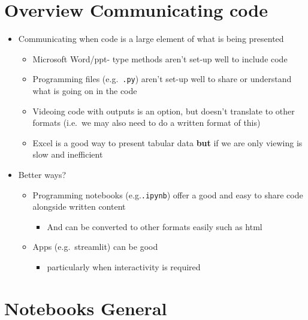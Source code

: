 \documentclass[
  letterpaper,
  DIV=11,
  numbers=noendperiod]{scrartcl}
\providecommand{\tightlist}{%
  \setlength{\itemsep}{0pt}\setlength{\parskip}{0pt}}\usepackage{longtable,booktabs,array}
\begin{document}
\hypertarget{overview-communicating-code}{%
\section{Overview Communicating
code}\label{overview-communicating-code}}

\begin{itemize}
\item
  Communicating when code is a large element of what is being presented

  \begin{itemize}
  \tightlist
  \item
    Microsoft Word/ppt- type methods aren't set-up well to include code
  \item
    Programming files (e.g.~\texttt{.py}) aren't set-up well to share or
    understand what is going on in the code
  \item
    Videoing code with outputs is an option, but doesn't translate to
    other formats (i.e.~we may also need to do a written format of this)
  \item
    Excel is a good way to present tabular data \textbf{but} if we are
    only viewing is slow and inefficient
  \end{itemize}
\item
  Better ways?

  \begin{itemize}
  \tightlist
  \item
    Programming notebooks (e.g.\texttt{.ipynb}) offer a good and easy to
    share code alongside written content

    \begin{itemize}
    \tightlist
    \item
      And can be converted to other formats easily such as html
    \end{itemize}
  \item
    Apps (e.g.~streamlit) can be good

    \begin{itemize}
    \tightlist
    \item
      particularly when interactivity is required
    \end{itemize}
  \end{itemize}
\end{itemize}

\hypertarget{notebooks-general}{%
\section{Notebooks General}\label{notebooks-general}}
\end{document}
